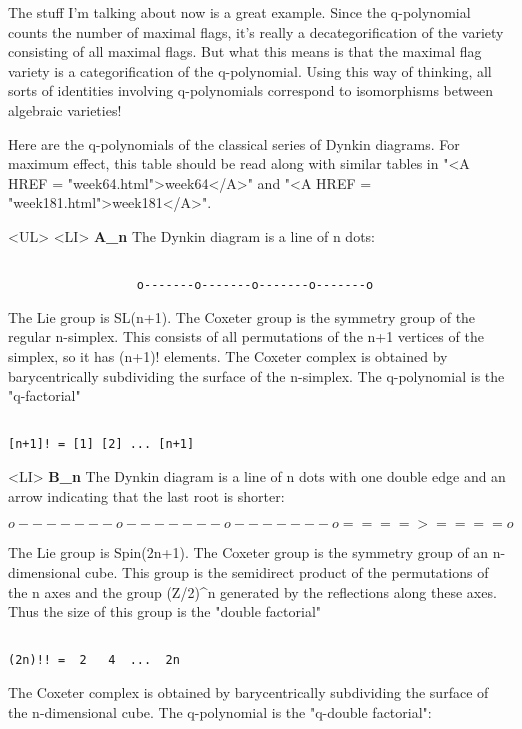 The stuff I'm talking about now is a great example.  Since the 
q-polynomial counts the number of maximal flags, it's really a 
decategorification of the variety consisting of all maximal 
flags.  But what this means is that the maximal flag variety 
is a categorification of the q-polynomial.  Using this way of 
thinking, all sorts of identities involving q-polynomials 
correspond to isomorphisms between algebraic varieties! 

Here are the q-polynomials of the classical series of Dynkin 
diagrams.  For maximum effect, this table should be read along 
with similar tables in "<A HREF = "week64.html">week64</A>" and "<A HREF = "week181.html">week181</A>".   

<UL>
<LI>
\textbf{A_{n}} The Dynkin diagram is a line of n dots:


\begin{verbatim}

                  o-------o-------o-------o-------o
\end{verbatim}
    
The Lie group is SL(n+1).   The Coxeter group is the symmetry group of 
the regular n-simplex.  This consists of all permutations of the n+1
vertices of the simplex, so it has (n+1)! elements.  The Coxeter complex
is obtained by barycentrically subdividing the surface of the n-simplex.  
The q-polynomial is the "q-factorial"


\begin{verbatim}

[n+1]! = [1] [2] ... [n+1]
\end{verbatim}
    
<LI>
\textbf{B_{n}} 
The Dynkin diagram is a line of n dots with one double edge
and an arrow indicating that the last root is shorter:


$$

                 o-------o-------o-------o====>====o 
$$
    
The Lie group is Spin(2n+1).  The Coxeter group is the symmetry group of 
an n-dimensional cube.  This group is the semidirect product of the 
permutations of the n axes and the group (Z/2)^{n} generated by the
reflections along these axes.   Thus the size of this group is the 
"double factorial" 


\begin{verbatim}

(2n)!! =  2   4  ...  2n
\end{verbatim}
    
The Coxeter complex is obtained by barycentrically subdividing the
surface of the n-dimensional cube.  The q-polynomial is the 
"q-double factorial":


